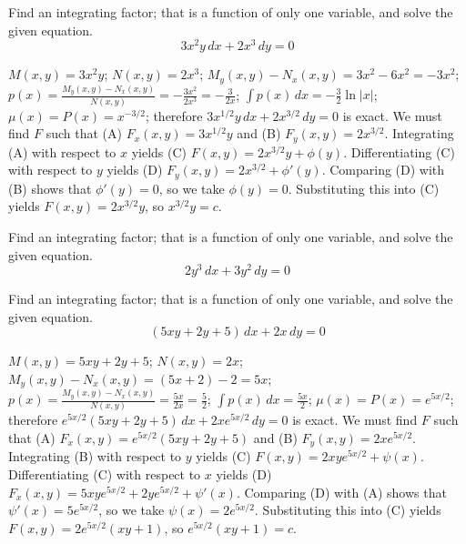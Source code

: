 \documentclass{ximera}
\begin{document}
\begin{problem}\label{exer:2.6.4} Find an integrating factor; that is a function of only one variable, and solve the given equation.
$$3x^2y\,dx+2x^3\,dy=0$$



\begin{solution}
    $M(x,y)=3x^2y$;\;
$N(x,y)=2x^3$;\;
$M_y(x,y)-N_x(x,y)=3x^2-6x^2=-3x^2$;\;
$p(x)=\frac{M_y(x,y)-N_x(x,y)}{
N(x,y)}=-\frac{3x^2}{2x^3}=-\frac{3}{2x}$;\;
$\int p(x)\,dx=-\frac{3}{2}\ln|x|$;\;
$\mu(x)=P(x)=x^{-3/2}$;
therefore
$3x^{1/2}y\,dx+2x^{3/2}\,dy=0$
is exact.
We must find $F$ such that
(A) $F_x(x,y)=3x^{1/2}y$ and
(B) $F_y(x,y)=2x^{3/2}$.
Integrating (A) with respect to $x$ yields
(C) $F(x,y)=2x^{3/2}y+\phi(y)$.
Differentiating (C) with respect to $y$  yields
(D) $F_y(x,y)=2x^{3/2}+\phi'(y)$.
Comparing (D) with (B)  shows that
$\phi'(y)=0$, so we take
$\phi(y)=0$.
Substituting this into (C) yields
$F(x,y)=2x^{3/2}y$,
so $x^{3/2}y=c$.
\end{solution}
\end{problem}

\begin{problem}\label{exer:2.6.5} Find an integrating factor; that is a function of only one variable, and solve the given equation.
$$2y^3\,dx+3y^2\,dy=0$$
\end{problem}

\begin{problem}\label{exer:2.6.6} Find an integrating factor; that is a function of only one variable, and solve the given equation.
$$(5xy+2y+5)\,dx+2x\,dy=0$$



\begin{solution}
    $M(x,y)=5xy+2y+5$;\;
$N(x,y)=2x$;\;
$M_y(x,y)-N_x(x,y)=(5x+2)-2=5x$;\;
$p(x)=\frac{M_y(x,y)-N_x(x,y)}{
N(x,y)}=\frac{5x}{2x}=\frac{5}{2}$;\;
$\int p(x)\,dx=\frac{5x}{2}$;\;
$\mu(x)=P(x)=e^{5x/2}$;
therefore
$e^{5x/2}(5xy+2y+5)\,dx+2xe^{5x/2}\,dy=0$
is exact.
We must find $F$ such that
(A) $F_x(x,y)=e^{5x/2}(5xy+2y+5)$ and
(B) $F_y(x,y)=2xe^{5x/2}$.
Integrating (B) with respect to $y$ yields
(C) $F(x,y)=2xye^{5x/2}+\psi(x)$.
Differentiating (C) with respect to $x$  yields
(D) $F_x(x,y)=5xye^{5x/2}+2ye^{5x/2}+\psi'(x)$.
Comparing (D) with (A)  shows that
$\psi'(x)=5e^{5x/2}$, so we take
$\psi(x)=2e^{5x/2}$.
Substituting this into (C) yields
$F(x,y)=2e^{5x/2}(xy+1)$,
so $e^{5x/2}(xy+1)=c$.
\end{solution}
\end{problem}
\end{document}
